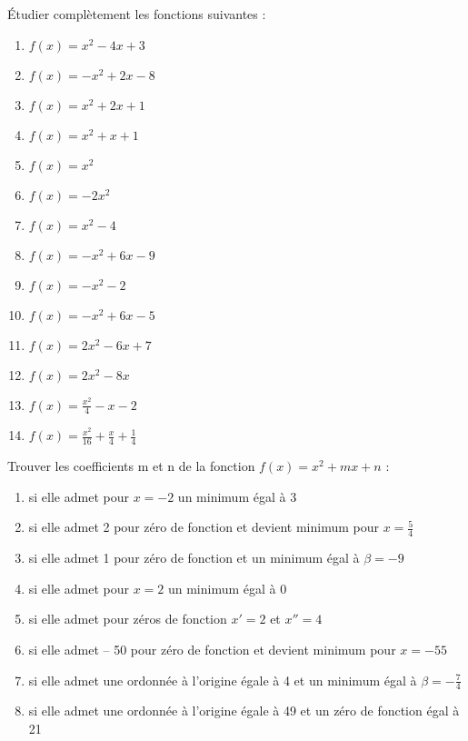 \begin{exercice}
Étudier complètement les fonctions suivantes :
\begin{multicols}{2}
\begin{enumerate}
\item $f(x)={{x}^{2}}-4x+3$ 
\item $f(x)=-{{x}^{2}}+2x-8$ 
\item $f(x)={{x}^{2}}+2x+1$ 
\item $f(x)={{x}^{2}}+x+1$
\item $f(x)={{x}^{2}}$
\item $f(x)=-2{{x}^{2}}$
\item $f(x)={{x}^{2}}-4$
\item $f(x)=-{{x}^{2}}+6x-9$
\item $f(x)=-{{x}^{2}}-2$
\item $f(x)=-{{x}^{2}}+6x-5$
\item $f(x)=2{{x}^{2}}-6x+7$
\item $f(x)=2{{x}^{2}}-8x$
\item $f(x)=\frac{{{x}^{2}}}{4}-x-2$
\item $f(x)=\frac{{{x}^{2}}}{16}+\frac{x}{4}+\frac{1}{4}$
\end{enumerate}
\end{multicols}
\end{exercice}

\begin{exercice}
Trouver les coefficients m et n de la fonction $f(x)={{x}^{2}}+mx+n$ :
\begin{enumerate}
\item si elle admet pour $x=-2$ un minimum égal à 3
\item si elle admet 2 pour zéro de fonction et devient minimum pour $x=\frac{5}{4}$
\item si elle admet 1 pour zéro de fonction et un minimum égal à $\beta =-9$
\item si elle admet pour $x=2$ un minimum égal à 0
\item si elle admet pour zéros de fonction ${x}'=2$ et ${x}''=4$
\item si elle admet – 50 pour zéro de fonction et devient minimum pour $x=-55$
\item si elle admet une ordonnée à l'origine égale à 4 et un minimum égal à $\beta =-\frac{7}{4}$
\item si elle admet une ordonnée à l'origine égale à 49 et un zéro de fonction égal à 21
\end{enumerate}
\end{exercice}

